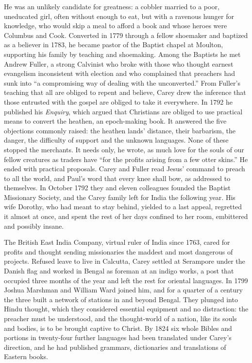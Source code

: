 He was an unlikely candidate for greatness: a cobbler married to a poor, uneducated girl, often
without enough to eat, but with a ravenous hunger for knowledge, who would skip a meal to afford a book and whose heroes were Columbus and Cook. Converted in 1779 through a fellow shoemaker and
baptized as a believer in 1783, he became pastor of the Baptist chapel at Moulton, supporting his
family by teaching and shoemaking. Among the Baptists he met Andrew Fuller, a strong Calvinist who
broke with those who thought earnest evangelism inconsistent with election and who complained that
preachers had sunk into ``a compromising way of dealing with the unconverted.'' From Fuller's
teaching that all are obliged to repent and believe, Carey drew the inference that those entrusted
with the gospel are obliged to take it everywhere. In 1792 he published his \emph{Enquiry}, which argued that Christians are obliged to use practical means to convert the heathen, an epoch-making book. It answered the five objections commonly raised:
the heathen lands' distance, their barbarism, the danger, the difficulty of support and the unknown
languages. None of these stopped the merchants. It needs only, he wrote, as much love for the souls
of our fellow creatures as traders have ``for the profits arising from a few otter skins.'' He ended
with practical proposals. Carey and Fuller read Jesus' command to preach to all the world, and Paul's
word that every knee shall bow, as addressed to themselves. In October 1792 they and eleven
colleagues founded the Baptist Missionary Society, and the Carey family left for India the following year. His wife Dorothy, who had meant to stay behind, yielded to a last appeal, regretted it almost
at once, and spent the rest of her days confined to her room, embittered and possibly insane.

The British East India Company, virtual ruler of India since 1763, cared for profits and thought
sending missionaries the maddest and most dangerous of projects. Refused leave to live in Calcutta,
Carey settled at Serampore under the Danish flag and worked in Bengal as foreman at an indigo works,
a post that occupied three months of the year and left the rest for oriental languages. In 1799
Joshua Marshman and William Ward joined him, and for a quarter of a century the three built a
network of stations in and beyond Bengal. They plunged into Hindu thought, which they considered
essential equipment and no distraction: the preacher must be understood, and the thought-world of a
nation, like its souls and bodies, is to be brought captive to Christ. By 1824 six whole Bibles and portions in twenty-four further languages had been translated under Carey's direction, and he had published grammars, dictionaries
and translations of Eastern books.

